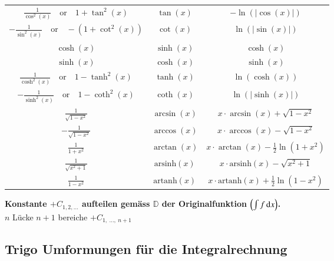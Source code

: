 \begin{center}
\begin{tabular}{| c  c  c |}
        $\frac{1}{\cos^2(x)} \quad \text{or} \quad 1 + \tan^2(x)$ & $\tan(x)$               & $- \ln(\vert \cos(x) \vert)$          \\
        $-\frac{1}{\sin^2(x)} \quad \text{or} \quad - (1 + \cot^2(x))$ & $\cot(x)$          & $\ln(\vert \sin(x) \vert)$            \\
        \hline
        $\cosh(x)$                                          & $\sinh(x)$                    & $\cosh(x)$                            \\
        $\sinh(x)$                                          & $\cosh(x)$                    & $\sinh(x)$                            \\
        $\frac{1}{\cosh^2(x)} \quad \text{or} \quad 1 - \tanh^2(x)$ & $\tanh(x)$            & $\ln(\cosh(x))$                       \\
        $-\frac{1}{\sinh^2(x)} \quad \text{or} \quad 1 - \coth^2(x)$ & $\coth(x)$           & $\ln(\vert \sinh(x) \vert)$           \\
        \hline
        $\frac{1}{\sqrt{1 - x^2}}$                          & $\arcsin(x)$                  & $x \cdot \arcsin(x) + \sqrt{1- x^2 }$ \\
        $- \frac{1}{\sqrt{1 - x^2}}$                        & $\arccos(x)$                  & $x \cdot \arccos(x) - \sqrt{1- x^2 }$ \\
        $\frac{1}{1 + x^2}$                                 & $\arctan(x)$                  & $x \cdot \arctan(x) - \frac{1}{2} \ln(1 + x^2) $ \\
        \hline
        $\frac{1}{\sqrt{x^2 + 1}}$                          & $\mathrm{arsinh}(x)$          & $x \cdot \mathrm{arsinh}(x) - \sqrt{x^2 +1 } $ \\
        $\frac{1}{1- x^2}$                                  & $\mathrm{artanh}(x)$          & $x \cdot \mathrm{artanh}(x) + \frac{1}{2} \ln(1-x^2) $ \\
        \hline
    \end{tabular}
    \renewcommand{\arraystretch}{1}
\end{center}

\textbf{\color{orange}Konstante $+C_{1,2, \dots}$ aufteilen gemäss $\mathbb{D}$ der Originalfunktion $\left(\int f\mathop{} \! \mathrm{d} x\right)$.}\\
$n$ Lücke \quad \textrightarrow \quad $n+1$ bereiche \quad \textrightarrow \quad $+C_{1,\ \dots,\ n+1}$

\subsection{Trigo Umformungen für die Integralrechnung}%


